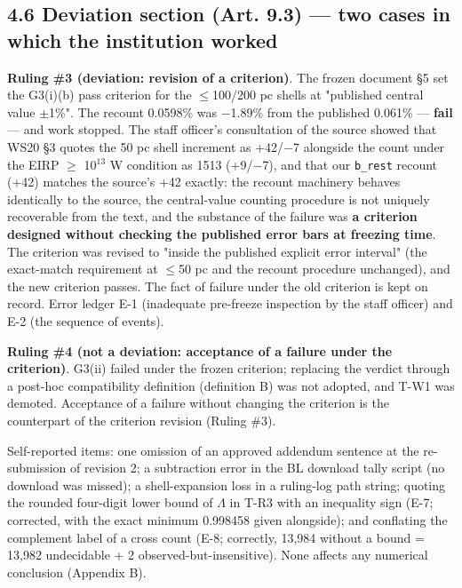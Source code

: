\documentclass[11pt]{article}
\begin{document}
\subsection*{4.6 Deviation section (Art. 9.3) --- two cases in which the institution worked}
\noindent \textbf{Ruling \#3 (deviation: revision of a criterion)}. The frozen document \S{}5 set the G3(i)(b) pass criterion for the \(\leq\)100/200 pc shells at "published central value \(\pm\)1\%". The recount 0.0598\% was \(-\)1.89\% from the published 0.061\% --- \textbf{fail} --- and work stopped. The staff officer's consultation of the source showed that WS20 \S{}3 quotes the 50 pc shell increment as +42/\(-\)7 alongside the count under the EIRP \(\geq\) 10\(^{13}\) W condition as 1513 (+9/\(-\)7), and that our \texttt{b\_rest} recount (+42) matches the source's +42 exactly: the recount machinery behaves identically to the source, the central-value counting procedure is not uniquely recoverable from the text, and the substance of the failure was \textbf{a criterion designed without checking the published error bars at freezing time}. The criterion was revised to "inside the published explicit error interval" (the exact-match requirement at \(\leq\)50 pc and the recount procedure unchanged), and the new criterion passes. The fact of failure under the old criterion is kept on record. Error ledger E-1 (inadequate pre-freeze inspection by the staff officer) and E-2 (the sequence of events).\par\smallskip
\noindent \textbf{Ruling \#4 (not a deviation: acceptance of a failure under the criterion)}. G3(ii) failed under the frozen criterion; replacing the verdict through a post-hoc compatibility definition (definition B) was not adopted, and T-W1 was demoted. Acceptance of a failure without changing the criterion is the counterpart of the criterion revision (Ruling \#3).\par\smallskip
\noindent Self-reported items: one omission of an approved addendum sentence at the re-submission of revision 2; a subtraction error in the BL download tally script (no download was missed); a shell-expansion loss in a ruling-log path string; quoting the rounded four-digit lower bound of \(\Lambda\) in T-R3 with an inequality sign (E-7; corrected, with the exact minimum 0.998458 given alongside); and conflating the complement label of a cross count (E-8; correctly, 13,984 without a bound = 13,982 undecidable + 2 observed-but-insensitive). None affects any numerical conclusion (Appendix B).\par\smallskip
\end{document}

